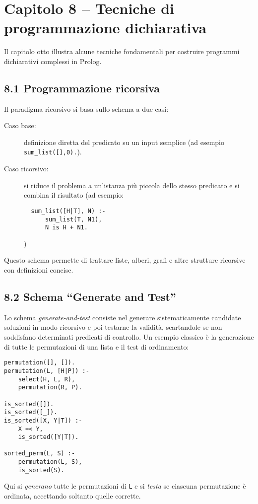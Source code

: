 \documentclass[12pt]{article}
\begin{document}
\section*{Capitolo 8 – Tecniche di programmazione dichiarativa}

Il capitolo otto illustra alcune tecniche fondamentali per costruire programmi dichiarativi complessi in Prolog.

\subsection*{8.1 Programmazione ricorsiva}

Il paradigma ricorsivo si basa sullo schema a due casi:
\begin{description}
  \item[Caso base:] definizione diretta del predicato su un input semplice (ad esempio \texttt{sum\_list([],0).}).
  \item[Caso ricorsivo:] si riduce il problema a un'istanza più piccola dello stesso predicato e si combina il risultato (ad esempio:
  \begin{verbatim}
  sum_list([H|T], N) :-
      sum_list(T, N1),
      N is H + N1.
  \end{verbatim})
\end{description}
Questo schema permette di trattare liste, alberi, grafi e altre strutture ricorsive con definizioni concise.

\subsection*{8.2 Schema ``Generate and Test''}

Lo schema \emph{generate-and-test} consiste nel generare sistematicamente candidate soluzioni in modo ricorsivo e poi testarne la validità, scartandole se non soddisfano determinati predicati di controllo. Un esempio classico è la generazione di tutte le permutazioni di una lista e il test di ordinamento:
\begin{verbatim}
permutation([], []).
permutation(L, [H|P]) :-
    select(H, L, R),
    permutation(R, P).

is_sorted([]).
is_sorted([_]).
is_sorted([X, Y|T]) :-
    X =< Y,
    is_sorted([Y|T]).

sorted_perm(L, S) :-
    permutation(L, S),
    is_sorted(S).
\end{verbatim}
Qui si \emph{generano} tutte le permutazioni di \texttt{L} e si \emph{testa} se ciascuna permutazione è ordinata, accettando soltanto quelle corrette.
\end{document}
